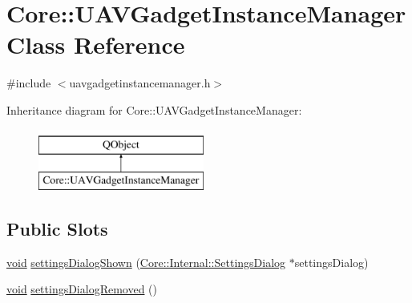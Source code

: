 \hypertarget{class_core_1_1_u_a_v_gadget_instance_manager}{\section{Core\-:\-:U\-A\-V\-Gadget\-Instance\-Manager Class Reference}
\label{class_core_1_1_u_a_v_gadget_instance_manager}
}


{\ttfamily \#include $<$uavgadgetinstancemanager.\-h$>$}

Inheritance diagram for Core\-:\-:U\-A\-V\-Gadget\-Instance\-Manager\-:\begin{figure}[H]
\begin{center}
\leavevmode
\includegraphics[height=2.000000cm]{class_core_1_1_u_a_v_gadget_instance_manager}
\end{center}
\end{figure}
\subsection*{Public Slots}
\begin{DoxyCompactItemize}
\item 
\hyperlink{group___u_a_v_objects_plugin_ga444cf2ff3f0ecbe028adce838d373f5c}{void} \hyperlink{group___core_plugin_ga1d8e47ad72e66fd0f3a47ffa62fb7728}{settings\-Dialog\-Shown} (\hyperlink{class_core_1_1_internal_1_1_settings_dialog}{Core\-::\-Internal\-::\-Settings\-Dialog} $\ast$settings\-Dialog)
\item 
\hyperlink{group___u_a_v_objects_plugin_ga444cf2ff3f0ecbe028adce838d373f5c}{void} \hyperlink{group___core_plugin_ga602b76a9cb7212662ec3e902a6b92b77}{settings\-Dialog\-Removed} ()
\end{DoxyCompactItemize}
